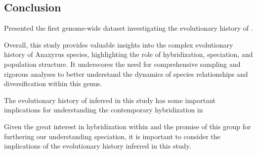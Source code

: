 \subsection{Conclusion}

Presented the first genome-wide dataset investigating the evolutionary 
history of \anaxyrus.


Overall, this study provides valuable insights into the complex evolutionary 
history of Anaxyrus species, highlighting the role of hybridization, speciation, 
and population structure. It underscores the need for comprehensive sampling and 
rigorous analyses to better understand the dynamics of species relationships and 
diversification within this genus.

The evolutionary history of \anaxyrus inferred in this study has some important 
implications for understanding the contemporary hybridization in \anaxyrus


Given the great interest in hybridization within \anaxyrus and the promise of this 
group for furthering our understanding speciation, it is important to consider the 
implications of the evolutionary history inferred in this study.


